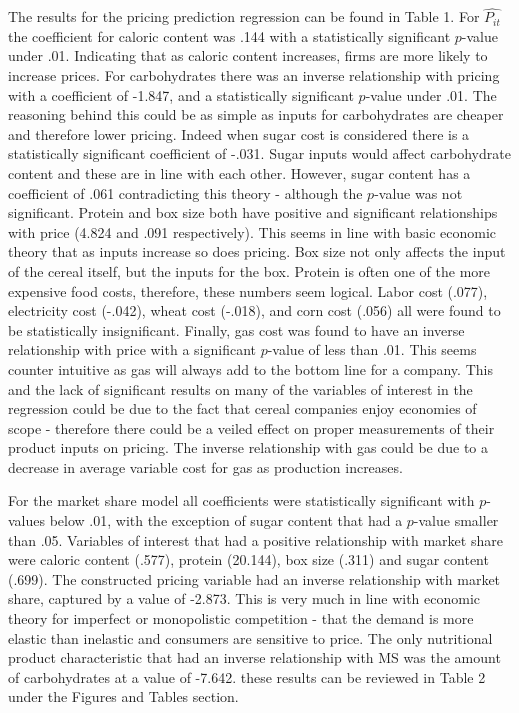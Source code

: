 \documentclass[12pt,english]{article}
\begin{document}
\tab The results for the pricing prediction regression can be found in Table 1. For $\widehat{P_{it}}$ the coefficient for caloric content was .144 with a statistically significant $p$-value under .01. Indicating that as caloric content increases, firms are more likely to increase prices. For carbohydrates there was an inverse relationship with pricing with a coefficient of -1.847, and a statistically significant $p$-value under .01. The reasoning behind this could be as simple as inputs for carbohydrates are cheaper and therefore lower pricing. Indeed when sugar cost is considered there is a statistically significant coefficient of -.031. Sugar inputs would affect carbohydrate content and these are in line with each other. However, sugar content has a coefficient of .061 contradicting this theory - although the $p$-value was not significant. Protein and box size both have positive and significant relationships with price (4.824 and .091 respectively). This seems in line with basic economic theory that as inputs increase so does pricing. Box size not only affects the input of the cereal itself, but the inputs for the box. Protein is often one of the more expensive food costs, therefore, these numbers seem logical. Labor cost (.077), electricity cost (-.042), wheat cost (-.018), and corn cost (.056) all were found to be statistically insignificant. Finally, gas cost was found to have an inverse relationship with price with a significant $p$-value of less than .01. This seems counter intuitive as gas will always add to the bottom line for a company. This and the lack of significant results on many of the variables of interest in the regression could be due to the fact that cereal companies enjoy economies of scope - therefore there could be a veiled effect on proper measurements of their product inputs on pricing. The inverse relationship with gas could be due to a decrease in average variable cost for gas as production increases.

\tab For the market share model all coefficients were statistically significant with $p$-values below .01, with the exception of sugar content that had a $p$-value smaller than .05. Variables of interest that had a positive relationship with market share were caloric content (.577), protein (20.144), box size (.311) and sugar content (.699). The constructed pricing variable had an inverse relationship with market share, captured by a value of -2.873. This is very much in line with economic theory for imperfect or monopolistic competition - that the demand is more elastic than inelastic and consumers are sensitive to price. The only nutritional product characteristic that had an inverse relationship with MS was the amount of carbohydrates at a value of -7.642. these results can be reviewed in Table 2 under the Figures and Tables section.
 
\end{document}
